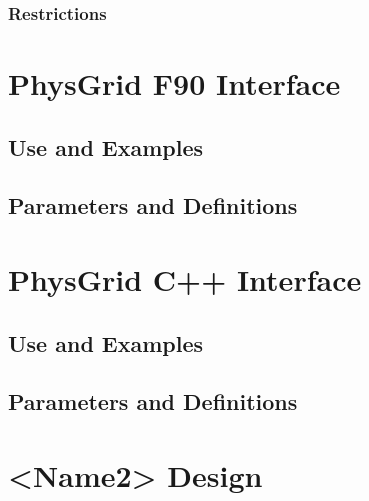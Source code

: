 \documentclass[]{article}
\begin{document}
\subsubsection{Restrictions}




\section{PhysGrid F90 Interface}

\subsection{Use and Examples}




\subsection{Parameters and Definitions}








\section{PhysGrid C++ Interface}

\subsection{Use and Examples}




\subsection{Parameters and Definitions}




% 
% 

\section{<Name2> Design}
\end{document}

